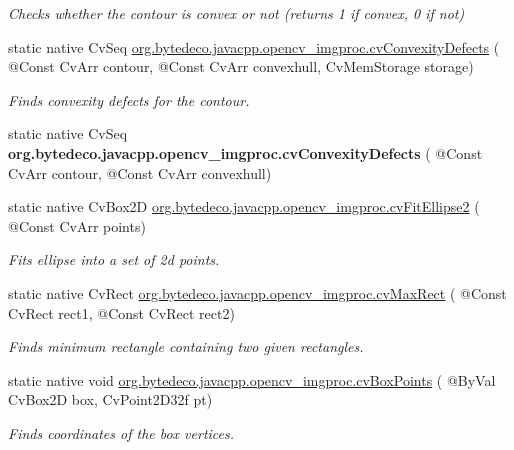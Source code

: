 \begin{DoxyCompactItemize}
\begin{DoxyCompactList}\small\item\em Checks whether the contour is convex or not (returns 1 if convex, 0 if not) \end{DoxyCompactList}\item 
static native Cv\+Seq \hyperlink{group__imgproc__c_ga186461d20f3b430d538560470ed76ea1}{org.\+bytedeco.\+javacpp.\+opencv\+\_\+imgproc.\+cv\+Convexity\+Defects} ( @Const Cv\+Arr contour, @Const Cv\+Arr convexhull, Cv\+Mem\+Storage storage)
\begin{DoxyCompactList}\small\item\em Finds convexity defects for the contour. \end{DoxyCompactList}\item 
\mbox{\label{group__imgproc__c_ga49e0112e2209af5faa7a526a822fd214}} 
static native Cv\+Seq {\bfseries org.\+bytedeco.\+javacpp.\+opencv\+\_\+imgproc.\+cv\+Convexity\+Defects} ( @Const Cv\+Arr contour, @Const Cv\+Arr convexhull)
\item 
static native Cv\+Box2D \hyperlink{group__imgproc__c_ga417295a4b5e1071f6af64972132cecac}{org.\+bytedeco.\+javacpp.\+opencv\+\_\+imgproc.\+cv\+Fit\+Ellipse2} ( @Const Cv\+Arr points)
\begin{DoxyCompactList}\small\item\em Fits ellipse into a set of 2d points. \end{DoxyCompactList}\item 
\mbox{\label{group__imgproc__c_ga3861a1015ad4bb47dd5ac88cf57b9cde}} 
static native Cv\+Rect \hyperlink{group__imgproc__c_ga3861a1015ad4bb47dd5ac88cf57b9cde}{org.\+bytedeco.\+javacpp.\+opencv\+\_\+imgproc.\+cv\+Max\+Rect} ( @Const Cv\+Rect rect1, @Const Cv\+Rect rect2)
\begin{DoxyCompactList}\small\item\em Finds minimum rectangle containing two given rectangles. \end{DoxyCompactList}\item 
\mbox{\label{group__imgproc__c_ga9832ef1547e4d1a64768e2d09aefa8ce}} 
static native void \hyperlink{group__imgproc__c_ga9832ef1547e4d1a64768e2d09aefa8ce}{org.\+bytedeco.\+javacpp.\+opencv\+\_\+imgproc.\+cv\+Box\+Points} ( @By\+Val Cv\+Box2D box, Cv\+Point2\+D32f pt)
\begin{DoxyCompactList}\small\item\em Finds coordinates of the box vertices. \end{DoxyCompactList}\item 

\end{DoxyCompactItemize}
